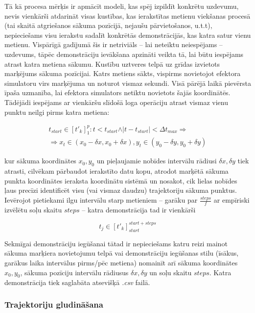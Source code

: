 \documentclass[12pt, a4paper]{article}
\numberwithin{equation}{section} %
\begin{document}
Tā kā procesa mērķis ir apmācīt modeli, kas spēj izpildīt konkrētu uzdevumu, nevis vienkārši atdarināt visas kustības, kas ierakstītas metienu viekšanas procesā (tai skaitā atgriešanos sākuma pozīcijā, nejaušu pārvietošanos, u.t.t), nepieciešams visu ierakstu sadalīt konkrētās demonstrācijās, kas katra satur vienu metienu. Vispārīgā gadījumā šis ir netriviāls -- lai neteiktu neiespējams -- uzdevums, tāpēc demonstrāciju ievākšana apzināti veikta tā, lai būtu iespējams atrast katra metiena sākumu. Kustību uztveres telpā uz grīdas izvietots marķējums sākuma pozīcijai. Katrs metiens sākts, vispirms novietojot efektora simulatoru virs marķējuma un noturot vismaz sekundi. Visā pārējā laikā pievērsta īpaša uzmanība, lai efektora simulators netiktu novietots šajās koordinātēs. Tādējādi iespējams ar vienkāršu slīdošā loga operāciju atrast vismaz vienu punktu neilgi pirms katra metiena:

\begin{multline}
    t_{start} \in [t'_{k}]^p_1: t < t_{start} \land \vert t - t_{start} \vert < \Delta t_{max} \Rightarrow \\ \Rightarrow x_t \in (x_{0} - \delta x, x_{0} + \delta x ), y_t \in  (y_{0} - \delta y, y_{0} + \delta y )
\end{multline}

kur sākuma koordinātes $x_0, y_0$ un pieļaujamie nobīdes intervālu rādiusi $\delta x, \delta y$ tiek atrasti, cilvēkam pārbaudot ierakstīto datu kopu, atrodot marķētā sākuma punkta koordinātes ieraksta koordinātu sistēmā un nosakot, cik lielas nobīdes ļaus precīzi identificēt visu (vai vismaz daudzu) trajektoriju sākuma punktus. Ievērojot pietiekami ilgu intervālu starp metieniem -- garāku par $\frac{steps}{f}$ ar empīriski izvēlētu soļu skaitu $steps$ --  katra demonstrācija tad ir vienkārši 

\begin{equation}
    t_{j} \in [t'_{k}]^{start+steps}_{start}
\end{equation}

Sekmīgai demonstrāciju iegūšanai tātad ir nepieciešams katru reizi mainot sākuma marķiera novietojumu telpā vai demonstrāciju iegūšanas stilu (īsākus, garākus laika intervālus pirms/pēc metiena) nomainīt arī sākuma koordinātes $x_0, y_0$, sākuma pozīciju intervālu rādiusus $\delta x, \delta y$ un soļu skaitu $steps$. Katra demonstrācija tiek saglabāta atsevišķā \textit{.csv} failā.

\subsubsection{Trajektoriju gludināšana}
\end{document}
